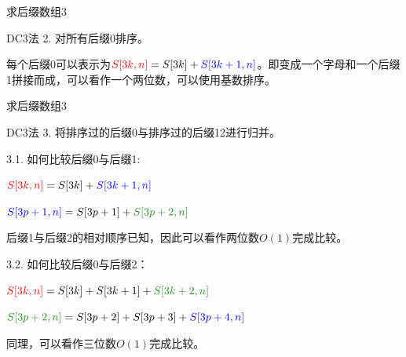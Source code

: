 \documentclass[usenames,dvipsnames]{ctexbeamer}		%
\begin{document}
\begin{frame}{求后缀数组3}

\begin{block}{DC3法}
2. 对所有{\color{red}后缀0}排序。

\begin{figure}
    \centering
{}
\end{figure}

每个{\color{red}后缀0}可以表示为${\color{red}S[3k,n]} = S[3k] + {\color{blue}S[3k+1, n]}$。即变成一个字母和一个{\color{blue}后缀1}拼接而成，可以看作一个两位数，可以使用基数排序。
\end{block}
    
\end{frame}

\begin{frame}{求后缀数组3}

\begin{block}{DC3法}
3. 将排序过的{\color{red}后缀0}与排序过的{\color{blue}后\color{forestgreen}缀\color{blue}1\color{forestgreen}2}进行归并。

\pause

\vbox{}
3.1. 如何比较{\color{red}后缀0}与{\color{blue}后缀1}:

${\color{red}S[3k,n]} = S[3k] + {\color{blue}S[3k+1,n]}$

${\color{blue}S[3p+1,n]} = S[3p+1] + {\color{forestgreen}S[3p+2,n]}$

{\color{blue}后缀1}与{\color{forestgreen}后缀2}的相对顺序已知，因此可以看作两位数$O(1)$完成比较。

\pause

\vbox{}

3.2. 如何比较{\color{red}后缀0}与{\color{forestgreen}后缀2}：

${\color{red}S[3k,n]} = S[3k] + S[3k + 1] + {\color{forestgreen}S[3k+2,n]}$

${\color{forestgreen}S[3p+2,n]} = S[3p+2] + S[3p+3] + {\color{blue}S[3p+4,n]}$

同理，可以看作三位数$O(1)$完成比较。
\end{block}
    
\end{frame}
\end{document}
